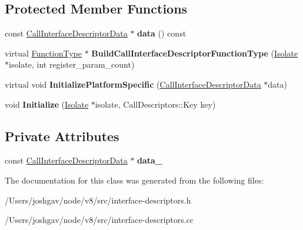 \subsection*{Protected Member Functions}
\begin{DoxyCompactItemize}
\item 
const \hyperlink{classv8_1_1internal_1_1_call_interface_descriptor_data}{Call\+Interface\+Descriptor\+Data} $\ast$ {\bfseries data} () const \hypertarget{classv8_1_1internal_1_1_call_interface_descriptor_acd20eb1efadbcce564cc30fe518e811c}{}\label{classv8_1_1internal_1_1_call_interface_descriptor_acd20eb1efadbcce564cc30fe518e811c}

\item 
virtual \hyperlink{classv8_1_1internal_1_1_function_type}{Function\+Type} $\ast$ {\bfseries Build\+Call\+Interface\+Descriptor\+Function\+Type} (\hyperlink{classv8_1_1internal_1_1_isolate}{Isolate} $\ast$isolate, int register\+\_\+param\+\_\+count)\hypertarget{classv8_1_1internal_1_1_call_interface_descriptor_a81c431029f8f88b2c8c704c1fc70f14b}{}\label{classv8_1_1internal_1_1_call_interface_descriptor_a81c431029f8f88b2c8c704c1fc70f14b}

\item 
virtual void {\bfseries Initialize\+Platform\+Specific} (\hyperlink{classv8_1_1internal_1_1_call_interface_descriptor_data}{Call\+Interface\+Descriptor\+Data} $\ast$data)\hypertarget{classv8_1_1internal_1_1_call_interface_descriptor_aa40f17d0e6cfefbbe78d077a7de52bcf}{}\label{classv8_1_1internal_1_1_call_interface_descriptor_aa40f17d0e6cfefbbe78d077a7de52bcf}

\item 
void {\bfseries Initialize} (\hyperlink{classv8_1_1internal_1_1_isolate}{Isolate} $\ast$isolate, Call\+Descriptors\+::\+Key key)\hypertarget{classv8_1_1internal_1_1_call_interface_descriptor_a3cd47a16364c785bb776a5728006d4d6}{}\label{classv8_1_1internal_1_1_call_interface_descriptor_a3cd47a16364c785bb776a5728006d4d6}

\end{DoxyCompactItemize}
\subsection*{Private Attributes}
\begin{DoxyCompactItemize}
\item 
const \hyperlink{classv8_1_1internal_1_1_call_interface_descriptor_data}{Call\+Interface\+Descriptor\+Data} $\ast$ {\bfseries data\+\_\+}\hypertarget{classv8_1_1internal_1_1_call_interface_descriptor_a48f66b36fc96b08d69ffaf4742b8d8bd}{}\label{classv8_1_1internal_1_1_call_interface_descriptor_a48f66b36fc96b08d69ffaf4742b8d8bd}

\end{DoxyCompactItemize}


The documentation for this class was generated from the following files\+:\begin{DoxyCompactItemize}
\item 
/\+Users/joshgav/node/v8/src/interface-\/descriptors.\+h\item 
/\+Users/joshgav/node/v8/src/interface-\/descriptors.\+cc\end{DoxyCompactItemize}
